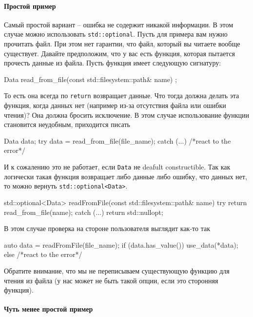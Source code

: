 \paragraph{Простой пример}

Самый простой вариант -- ошибка не содержит никакой информации.
В этом случае можно использовать \verb"std::optional".
Пусть для примера вам нужно прочитать файл.
При этом нет гарантии, что файл, который вы читаете вообще существует.
Давайте предположим, что у вас есть функция, которая пытается прочесть данные из файла.
Пусть функция имеет следующую сигнатуру:
\begin{cppcode}
Data read_from_file(const std::filesystem::path& name) ;
\end{cppcode}
То есть она всегда по \verb"return" возвращает данные.
Что тогда должна делать эта функция, когда данных нет (например из-за отсутствия файла или ошибки чтения)?
Она должна бросить исключение.
В этом случае использование функции становится неудобным, приходится писать
\begin{cppcode}
Data data;
try {
  data = read_from_file(file_name);
} catch (...) {
  /*react to the error*/
}
\end{cppcode}
И к сожалению это не работает, если \verb"Data" не deafult constructible.
Так как логически такая функция возвращает либо данные либо ошибку, что данных нет, то можно вернуть \verb"std::optional<Data>".
\begin{cppcode}
std::optional<Data> readFromFile(const std::filesystem::path& name) {
  try {
    return read_from_file(name);
  } catch (...) {
    return std::nullopt;
  }
}
\end{cppcode}
В этом случае проверка на стороне пользователя выглядит как-то так
\begin{cppcode}
auto data = readFromFile(file_name);
if (data.has_value()) {
  use_data(*data);
} else {
  /*react to the error*/
}
\end{cppcode}
Обратите внимание, что мы не переписываем существующую функцию для чтения из файла (у нас может не быть такой опции, если это сторонняя функция).

\paragraph{Чуть менее простой пример}

